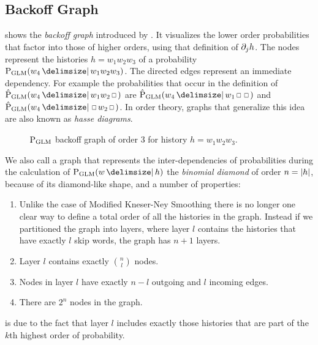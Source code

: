 \subsection{Backoff Graph}
\label{subsec:backoff-graph}

 shows the \emph{backoff graph} introduced by
\textcite{BilmesKirchhoff2003}.
It visualizes the lower order probabilities that factor into those of higher
orders, using that definition of $\SkpOp[j]{h}$.
The nodes represent the histories $h = w_1 w_2 w_3$ of a probability
$\ProbGLM{w_4}{w_1 w_2 w_3}$.
The directed edges represent an immediate dependency.
For example the probabilities that occur in the definition of
$\ProbGLM*{w_4}{w_1 w_2 \Skp}$ are $\ProbGLM*{w_4}{w_1 \Skp \Skp}$ and
$\ProbGLM*{w_4}{\Skp w_2 \Skp}$.
In order theory, graphs that generalize this idea are also known as
\emph{hasse diagrams}.

\begin{figure}
  \centering
  
  \caption{
    $\ProbGLM$ backoff graph of order 3 for history $h = w_1 w_2 w_3$.
  }
  \label{fig:history-glm}
\end{figure}


We also call a graph that represents the inter-dependencies of probabilities
during the calculation of $\ProbGLM{w}{h}$ the \emph{binomial diamond} of order
$n = {\left|h\right|}$, because of its diamond-like shape, and a number of
properties:

\begin{enumerate}
  \item \label{itm:num-layers} Unlike the case of Modified Kneser-Ney Smoothing
    there is no longer one clear way to define a total order of all the
    histories in the graph.
    Instead if we partitioned the graph into layers, where layer $l$ contains
    the histories that have exactly $l$ skip words,
    the graph has $n + 1$ layers.
  \item \label{itm:num-childs} Layer $l$ contains exactly $\binom{n}{l}$ nodes.
  \item \label{itm:num-edges}  Nodes in layer $l$ have exactly $n - l$ outgoing
    and $l$ incoming edges.
  \item \label{itm:num-nodes}  There are $2^n$ nodes in the graph.
\end{enumerate}

 is due to the fact that layer $l$ includes exactly those
histories that are part of the $k$th highest order of probability.

